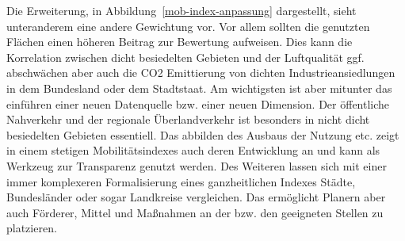 Die Erweiterung, in Abbildung~\ref{mob-index-anpassung} dargestellt, sieht unteranderem eine andere Gewichtung vor. Vor allem sollten die genutzten Flächen einen höheren Beitrag zur Bewertung aufweisen. Dies kann die Korrelation zwischen dicht besiedelten Gebieten und der Luftqualität ggf. abschwächen aber auch die CO2 Emittierung von dichten Industrieansiedlungen in dem Bundesland oder dem Stadtstaat.
Am wichtigsten ist aber mitunter das einführen einer neuen Datenquelle bzw. einer neuen Dimension. Der öffentliche Nahverkehr und der regionale Überlandverkehr ist besonders in nicht dicht besiedelten Gebieten essentiell.
Das abbilden des Ausbaus der Nutzung etc. zeigt in einem stetigen Mobilitätsindexes auch deren Entwicklung an und kann als Werkzeug zur Transparenz genutzt werden.
Des Weiteren lassen sich mit einer immer komplexeren Formalisierung eines ganzheitlichen Indexes Städte, Bundesländer oder sogar Landkreise vergleichen. Das ermöglicht Planern aber auch Förderer, Mittel und Maßnahmen an der bzw. den geeigneten Stellen zu platzieren.






